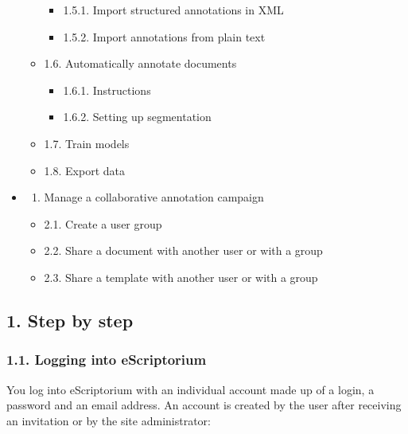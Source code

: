 \documentclass[
]{book}
\providecommand{\tightlist}{%
  \setlength{\itemsep}{0pt}\setlength{\parskip}{0pt}}
\begin{document}
\begin{itemize}
\begin{itemize}
    \begin{itemize}
    \item
      1.5.1. Import structured annotations in XML
    \item
      1.5.2. Import annotations from plain text
    \end{itemize}
  \item
    1.6. Automatically annotate documents

    \begin{itemize}
    \item
      1.6.1. Instructions
    \item
      1.6.2. Setting up segmentation
    \end{itemize}
  \item
    1.7. Train models
  \item
    1.8. Export data
  \end{itemize}
\item
  \begin{enumerate}
  \def\labelenumi{\arabic{enumi}.}
  \setcounter{enumi}{1}
  \tightlist
  \item
    Manage a collaborative annotation campaign
  \end{enumerate}

  \begin{itemize}
  \item
    2.1. Create a user group
  \item
    2.2. Share a document with another user or with a group
  \item
    2.3. Share a template with another user or with a group
  \end{itemize}
\end{itemize}

\hypertarget{step-by-step}{%
\subsection{1. Step by step}\label{step-by-step}}

\hypertarget{logging-into-escriptorium}{%
\subsubsection{1.1. Logging into eScriptorium}\label{logging-into-escriptorium}}

You log into eScriptorium with an individual account made up of a login,
a password and an email address. An account is created by the user after
receiving an invitation or by the site administrator:
\end{document}

